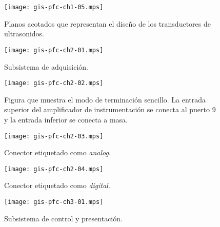 \documentclass[a4paper,12pt]				{article}
\begin{document}
\begin{figure}
	\begin{center}
		\texttt{[image: gis-pfc-ch1-05.mps]}
	\end{center}
	\caption[Transductores de ultrasonidos]{Planos acotados que
	representan el diseño de los transductores de ultrasonidos.}
	\label{fig:transducers}
\end{figure}

\begin{figure}
	\begin{center}
		\texttt{[image: gis-pfc-ch2-01.mps]}
	\end{center}
	\caption[Subsistema de adquisición]{Subsistema de adquisición.}
	\label{fig:subacqui}
\end{figure}

\begin{figure}
	\begin{center}
		\texttt{[image: gis-pfc-ch2-02.mps]}
	\end{center}
	\caption[Ejemplo de configuración de terminación]{Figura que
	muestra el modo de terminación sencillo. La entrada superior del
	amplificador de instrumentación se conecta al puerto 9 y la entrada
	inferior se conecta a masa.}
	\label{fig:termmodes}
\end{figure}

\clearpage

\begin{figure}
	\begin{center}
		\texttt{[image: gis-pfc-ch2-03.mps]}
	\end{center}
	\caption[Conector etiquetado como \emph{analog}]{Conector
	etiquetado como \emph{analog}.}
	\label{fig:analog}
\end{figure}

\begin{figure}
	\begin{center}
		\texttt{[image: gis-pfc-ch2-04.mps]}
	\end{center}
	\caption[Conector etiquetado como \emph{digital}]{Conector
	etiquetado como \emph{digital}.}
	\label{fig:digital}
\end{figure}

\begin{figure}
	\begin{center}
		\texttt{[image: gis-pfc-ch3-01.mps]}
	\end{center}
	\caption[Subsistema de control y presentación]{Subsistema de
	control y presentación.}
	\label{sub:control}
\end{figure}
\end{document}

